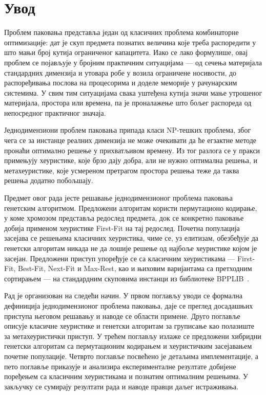 \chapter*{Увод}
{}

Проблем паковања представља један од класичних проблема комбинаторне оптимизације: дат
је скуп предмета познатих величина које треба распоредити у што мањи број кутија
ограниченог капацитета. Иако се лако формулише, овај проблем се појављује у бројним
практичним ситуацијама --- од сечења материјала стандардних димензија и утовара робе у
возила ограничене носивости, до распоређивања послова на процесорима и доделе меморије у
рачунарским системима. У свим тим ситуацијама свака уштеђена кутија значи мање утрошеног
материјала, простора или времена, па је проналажење што бољег распореда од непосредног
практичног значаја.

Једнодимензиони проблем паковања припада класи NP-тешких проблема, због чега се за
инстанце реалних димензија не може очекивати да ће егзактне методе пронаћи оптимално
решење у прихватљивом времену. Из тог разлога се у пракси примењују хеуристике, које брзо
дају добра, али не нужно оптимална решења, и метахеуристике, које усмереном претрагом
простора решења теже да таква решења додатно побољшају.

Предмет овог рада јесте решавање једнодимензионог проблема паковања генетским алгоритмом.
Предложени алгоритам користи пермутационо кодирање, у коме хромозом представља редослед
предмета, док се конкретно паковање добија применом хеуристике First-Fit на тај редослед.
Почетна популација засејава се решењима класичних хеуристика, чиме се, уз елитизам,
обезбеђује да генетски алгоритам никада не да лошије решење од најбоље хеуристике којом је
засејан. Предложени приступ упоређује се са класичним хеуристикама --- First-Fit,
Best-Fit, Next-Fit и Max-Rest, као и њиховим варијантама са претходним сортирањем --- на
стандардним скуповима инстанци из библиотеке BPPLIB~\cite{delorme2018}.

Рад је организован на следећи начин. У првом поглављу уводи се формална дефиниција
једнодимензионог проблема паковања, даје се преглед досадашњих приступа његовом решавању
и наводе се области примене. Друго поглавље описује класичне хеуристике и генетски
алгоритам за груписање као полазиште за метахеуристички приступ. У трећем поглављу излаже
се предложени хибридни генетски алгоритам са пермутационим кодирањем и хеуристичким
засејавањем почетне популације. Четврто поглавље посвећено је детаљима имплементације, а
пето поглавље приказује и анализира експерименталне резултате добијене поређењем са
класичним хеуристикама и познатим оптималним решењима. У закључку се сумирају резултати
рада и наводе правци даљег истраживања.
